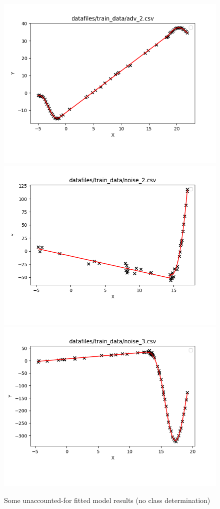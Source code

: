 \documentclass{article}
\begin{document}
\begin{figure}[!hbt]
  \includegraphics[scale=0.34]{./images/adv_2}
  \includegraphics[scale=0.34]{./images/noise_2}
  \includegraphics[scale=0.34]{./images/noise_3}
  \caption{Some unaccounted-for fitted model results (no class determination)}
  \label{fig:unaccounted}
\end{figure}
\end{document}
